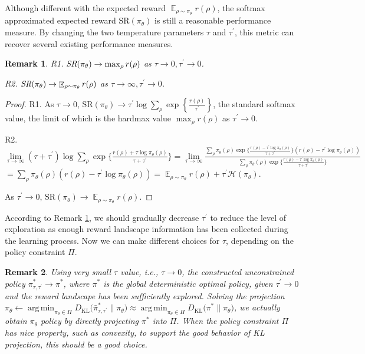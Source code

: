 \documentclass{article}
\DeclareMathOperator*\argmin{arg\,min}
\DeclareMathOperator*\ep{\mathbb{E}}
\newcommand{\KL}{D_{\text{KL}}}
\newcommand{\SR}{\text{SR}}
\newtheorem{remk}{Remark}
\begin{document}
Although different with the expected reward $\ep_{\rho \sim \pi_\theta}{r(\rho)}$, the softmax approximated expected reward $\SR(\pi_\theta)$ is still a reasonable performance measure. By changing the two temperature parameters $\tau$ and $\tau^{\prime}$, this metric can recover several existing performance measures.

\begin{remk}
\label{sr_limits}
R1. $\text{\em SR}(\pi_\theta) \to \max_{\rho}{r(\rho)}$ as $\tau \to 0, \tau^{\prime} \to 0$.

R2. $\text{\em SR}(\pi_\theta) \to \ep_{\rho \sim \pi_\theta}{r(\rho)}$ as $\tau \to \infty, \tau^{\prime} \to 0$.
\end{remk}
\begin{proof}
R1. As $\tau \to 0$, $\SR(\pi_\theta) \to \tau^{\prime} \log{ \sum_{\rho}{ \exp\left\{ \frac{r(\rho) }{ \tau^{\prime} } \right\} }}$, the standard softmax value, the limit of which is the hardmax value $\max_{\rho}{r(\rho)}$ as $\tau^{\prime} \to 0$.

R2. $\lim\limits_{\tau \to \infty}{ (\tau + \tau^{\prime})\log{ \sum_{\rho}{ \exp\{ \frac{r(\rho) + \tau \log{\pi_\theta(\rho)} }{\tau + \tau^{\prime}} \} }} }
= \lim\limits_{\tau \to \infty}{ \frac{ \sum_{\rho}{ \pi_\theta(\rho) \exp\{ \frac{r(\rho) - \tau^{\prime} \log{\pi_\theta(\rho)} }{\tau + \tau^{\prime}} \} \left( r(\rho) - \tau^{\prime}\log{\pi_\theta(\rho)} \right) } }{  \sum_{\rho}{ \pi_\theta(\rho) \exp\{ \frac{r(\rho) - \tau^{\prime} \log{\pi_\theta(\rho)} }{\tau + \tau^{\prime}} \} } } }$
$= \sum_{\rho}{ \pi_\theta(\rho) \left( r(\rho) - \tau^{\prime}\log{\pi_\theta(\rho)} \right) } = \ep_{\rho \sim \pi_\theta}{r(\rho)} + \tau^{\prime} \mathcal{H}(\pi_\theta)$.

As $\tau^{\prime} \to 0$, $\SR(\pi_\theta) \to \ep_{\rho \sim \pi_\theta}{r(\rho)}$.
\end{proof}

According to Remark \ref{sr_limits}, we should gradually decrease $\tau^{\prime}$ to reduce the level of exploration as enough reward landscape information has been collected during the learning process. Now we can make different choices for $\tau$, depending on the policy constraint $\Pi$.

\begin{remk}
\label{small_tau_choices}
Using very small $\tau$ value, i.e., $\tau \to 0$, the constructed unconstrained policy $\pi_{\tau,\tau^{\prime}}^* \to \pi^*$, where $\pi^*$ is the global deterministic optimal policy, given $\tau^{\prime} \to 0$ and the reward landscape has been sufficiently explored. Solving the projection $\pi_\theta \leftarrow \argmin_{\pi_\theta \in \Pi}{\KL(\bar{\pi}_{\tau,\tau^{\prime}}^* \| \pi_\theta}) \approx \argmin_{\pi_\theta \in \Pi}{\KL(\pi^* \| \pi_\theta})$, we actually obtain $\pi_\theta$ policy by directly projecting $\pi^*$ into $\Pi$. When the policy constraint $\Pi$ has nice property, such as convexity, to support the good behavior of KL projection, this should be a good choice.
\end{remk}
\end{document}

